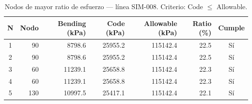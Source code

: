 \begin{table}[htbp]
  \centering
  \small
  \caption{Nodos de mayor ratio de esfuerzo — línea SIM-008. Criterio: Code $\leq$ Allowable.}
  \label{tab:top5-ratio}
  \begin{tabular}{crrrrrc}
    \toprule
    N & Nodo & Bending (\si{kPa}) & Code (\si{kPa}) & Allowable (\si{kPa}) & Ratio (\%) & Cumple \\
    \midrule
    1 & 90 & \num{8798.6} & \num{25955.2} & \num{115142.4} & 22.5 & Sí \\
    2 & 90 & \num{8798.6} & \num{25955.2} & \num{115142.4} & 22.5 & Sí \\
    3 & 60 & \num{11239.1} & \num{25658.8} & \num{115142.4} & 22.3 & Sí \\
    4 & 60 & \num{11239.1} & \num{25658.8} & \num{115142.4} & 22.3 & Sí \\
    5 & 130 & \num{10997.5} & \num{25417.1} & \num{115142.4} & 22.1 & Sí \\
    \bottomrule
  \end{tabular}
\end{table}
